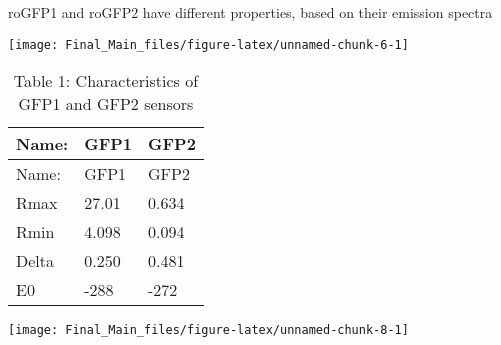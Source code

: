 \documentclass[]{article}
\begin{document}
roGFP1 and roGFP2 have different properties, based on their emission
spectra

\begin{center}\texttt{[image: Final\_Main\_files/figure-latex/unnamed-chunk-6-1]} \end{center}

\begin{longtable}[]{@{}lll@{}}
\caption{Table 1: Characteristics of GFP1 and GFP2
sensors}\tabularnewline
\toprule
Name: & GFP1 & GFP2\tabularnewline
\midrule
\endfirsthead
\toprule
Name: & GFP1 & GFP2\tabularnewline
\midrule
\endhead
Rmax & 27.01 & 0.634\tabularnewline
Rmin & 4.098 & 0.094\tabularnewline
Delta & 0.250 & 0.481\tabularnewline
E0 & -288 & -272\tabularnewline
\bottomrule
\end{longtable}

\begin{center}\texttt{[image: Final\_Main\_files/figure-latex/unnamed-chunk-8-1]} \end{center}
\end{document}
